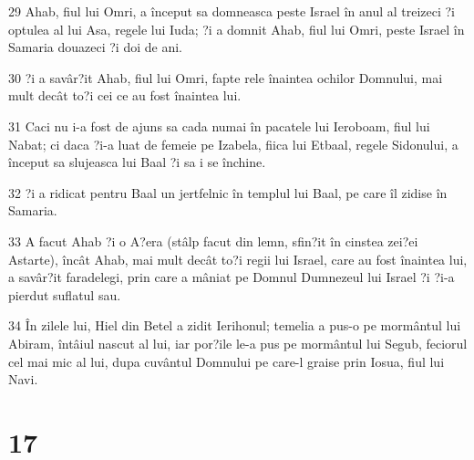 \par 29 Ahab, fiul lui Omri, a început sa domneasca peste Israel în anul al treizeci ?i optulea al lui Asa, regele lui Iuda; ?i a domnit Ahab, fiul lui Omri, peste Israel în Samaria douazeci ?i doi de ani.
\par 30 ?i a savâr?it Ahab, fiul lui Omri, fapte rele înaintea ochilor Domnului, mai mult decât to?i cei ce au fost înaintea lui.
\par 31 Caci nu i-a fost de ajuns sa cada numai în pacatele lui Ieroboam, fiul lui Nabat; ci daca ?i-a luat de femeie pe Izabela, fiica lui Etbaal, regele Sidonului, a început sa slujeasca lui Baal ?i sa i se închine.
\par 32 ?i a ridicat pentru Baal un jertfelnic în templul lui Baal, pe care îl zidise în Samaria.
\par 33 A facut Ahab ?i o A?era (stâlp facut din lemn, sfin?it în cinstea zei?ei Astarte), încât Ahab, mai mult decât to?i regii lui Israel, care au fost înaintea lui, a savâr?it faradelegi, prin care a mâniat pe Domnul Dumnezeul lui Israel ?i ?i-a pierdut suflatul sau.
\par 34 În zilele lui, Hiel din Betel a zidit Ierihonul; temelia a pus-o pe mormântul lui Abiram, întâiul nascut al lui, iar por?ile le-a pus pe mormântul lui Segub, feciorul cel mai mic al lui, dupa cuvântul Domnului pe care-l graise prin Iosua, fiul lui Navi.

\chapter{17}

